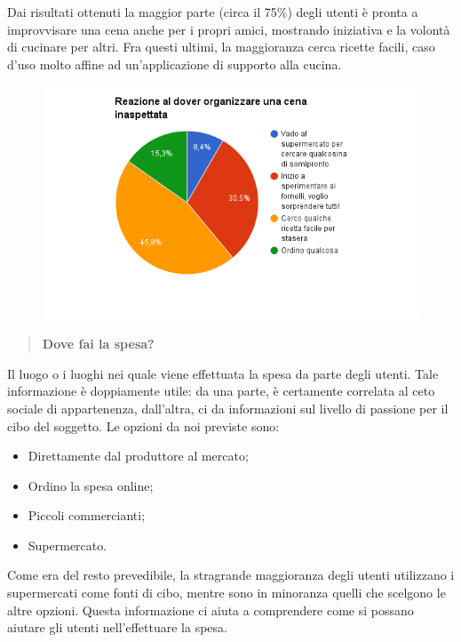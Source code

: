 Dai risultati ottenuti la maggior parte (circa il 75\%) degli utenti è pronta a improvvisare una cena anche per i propri amici, mostrando
iniziativa e la volontà di cucinare per altri. Fra questi ultimi, la maggioranza cerca ricette facili, caso d'uso molto affine
ad un'applicazione di supporto alla cucina.

\begin{figure}[H]
	\centering
	\includegraphics[scale=0.6]{img/chart_reazione_cena}
\end{figure}

\begin{quote}
	\textbf{Dove fai la spesa?}
\end{quote}
Il luogo o i luoghi nei quale viene effettuata la spesa da parte degli utenti. Tale informazione è doppiamente utile: da una parte,
è certamente correlata al ceto sociale di appartenenza, dall'altra, ci da informazioni sul livello di passione per il cibo del soggetto.
Le opzioni da noi previste sono:
\begin{itemize}
 \item Direttamente dal produttore al mercato;
 \item Ordino la spesa online;
 \item Piccoli commercianti;
 \item Supermercato.
\end{itemize}
Come era del resto prevedibile, la stragrande maggioranza degli utenti utilizzano i supermercati come fonti di cibo, mentre sono in minoranza quelli che
scelgono le altre opzioni. Questa informazione ci aiuta a comprendere come si possano aiutare gli utenti nell'effettuare la spesa.

